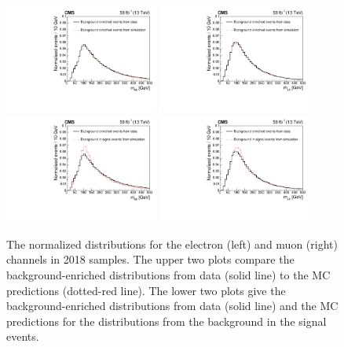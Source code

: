 \begin{figure}
    \centering
    \includegraphics[width=0.45\textwidth]{figure/BGClosureTest_18_el_CR_chi2_20_wobtag.pdf}
    \includegraphics[width=0.45\textwidth]{figure/BGClosureTest_18_mu_CR_chi2_20_wobtag.pdf}
    \includegraphics[width=0.45\textwidth]{figure/BGClosureTest_18_el_SR_chi2_20_wobtag.pdf}
    \includegraphics[width=0.45\textwidth]{figure/BGClosureTest_18_mu_SR_chi2_20_wobtag.pdf}
    \caption[The normalized \Mlb distributions in 2018 samples.]
    {
        The normalized \Mlb distributions for the electron (left) and muon (right) channels in 2018 samples.
        The upper two plots compare the background-enriched distributions from data (solid line) to the MC predictions (dotted-red line).
        The lower two plots give the background-enriched distributions from data (solid line) and the MC predictions for the distributions from the background in the signal events.
    }
    \label{fig:CR_SR_closure_test18}
\end{figure}

